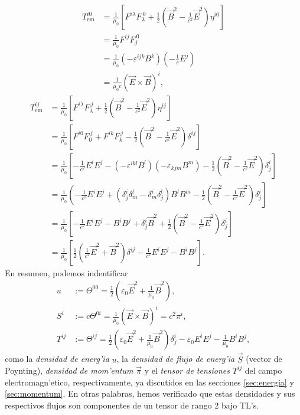 \begin{align}
T_\text{em}^{i0}  & =\frac{1}{\mu_0}\left[ F^{i\lambda}F_\lambda^{\ 0}+\frac
{1}{2}\left(  \vec{B}^2-\frac{1}{c^2}\vec{E}^2\right)  \eta^{i0}\right] \\
& =\frac{1}{\mu_0}F^{ij}F_j^{\ 0}\\
& =\frac{1}{\mu_0}(-\varepsilon^{ijk}B^k)  (-\frac{1}{c}E^j) \\
& =\frac{1}{\mu_0c}\left(\vec{E}\times\vec{B}\right)^i,
\end{align}%
\begin{align}
T_\text{em}^{ij}  & =\frac{1}{\mu_0}\left[  F^{i\lambda}F_\lambda^{\ j}+\frac
{1}{2}\left( \vec{B}^2-\frac{1}{c^2}\vec{E}^2\right) \eta^{ij}\right] \\
& =\frac{1}{\mu_0}\left[F^{i0}F_0^{\ j}+F^{ik}F_k^{\ j}-\frac{1}{2}\left(
\vec{B}^2-\frac{1}{c^2}\vec{E}^2\right) \delta^{ij}\right] \\
& =\frac{1}{\mu_0}\left[-\frac{1}{c^2}E^i E^j -\left(-\varepsilon^{ikl}B^l\right)  \left(
-\varepsilon_{kjm}B^m \right) -\frac{1}{2}\left(
\vec{B}^2-\frac{1}{c^2}\vec{E}^2\right)\delta_j^i\right] \\
& =\frac{1}{\mu_0}\left(-\frac{1}{c^2}E^i E^j
+\left(\delta_j^i\delta_{m}^{l}-\delta_{m}^i\delta_j^{l}\right)B^l B^m
-\frac{1}{2}\left(\vec{B}^2-\frac{1}{c^2}\vec{E}^2\right)\delta_j^i\right] \\
& =\frac{1}{\mu_0}\left[-\frac{1}{c^2}E^i E^j - B^i B^j +\delta_j^i\vec{B}^2+\frac{1}{2}\left(\vec{B}^2-\frac{1}{c^2}\vec{E}^2\right)\delta_j^i\right] \\
& =\frac{1}{\mu_0}\left[\frac{1}{2}\left(\frac{1}{c^2}\vec{E}^2 +\vec{B}^2\right)\delta^{ij}-\frac{1}{c^2}E^i E^j -B^i B^j\right].
\end{align}
En resumen, podemos indentificar
\begin{align}
u &:= \Theta^{00}=\frac{1}{2}\left(\varepsilon_0\vec{E}^2+\frac{1}{\mu_0}\vec{B}^2\right),\label{uTheta}\\
S^i &:= c\Theta^{0i}=\frac{1}{\mu_0}\left(\vec{E}\times\vec{B}\right)^i=c^2\pi^i, \label{STheta}\\
T^{ij} &:= \Theta^{ij}= \frac{1}{2}\left(\varepsilon_0\vec{E}^2+\frac{1}{\mu_0}\vec{B}^2\right)\delta_j^i-\varepsilon_0 E^i E^j -\frac{1}{\mu_0}B^i B^j , \label{TTheta}
\end{align}
como la \textit{densidad de energ'ia} $u$, la \textit{densidad de flujo de
energ'ia} $\vec{S}$ (vector de Poynting), \textit{densidad de mom'entum}
$\vec{\pi}$ y el \textit{tensor de tensiones} $T^{ij}$ del campo
electromagn'etico, respectivamente, ya discutidos en las secciones \ref{sec:energia} y \ref{sec:momentum}. En otras palabras, hemos verificado que estas densidades y sus respectivos flujos son componentes de un tensor de rango 2 bajo TL's.

